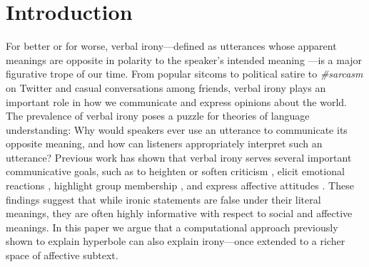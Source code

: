 \documentclass[10pt,letterpaper]{article}
\begin{document}
\section{Introduction}
For better or for worse, verbal irony---defined as utterances whose apparent meanings are opposite in polarity to the speaker's intended meaning \cite{roberts1994people, colston2000contrast}---is a major figurative trope of our time. From popular sitcoms to political satire to \emph{\#sarcasm} on Twitter and casual conversations among friends, verbal irony plays an important role in how we communicate and express  opinions about the world. The prevalence of verbal irony poses a puzzle for theories of language understanding: Why would speakers ever use an utterance to communicate its opposite meaning, and how can listeners appropriately interpret such an utterance? Previous work has shown that verbal irony serves several important communicative goals, such as to heighten or soften criticism \cite{colston1997salting}, elicit emotional reactions \cite{leggitt2000emotional}, highlight group membership \cite{gibbs2000irony}, and express affective attitudes \cite{colston1998you, colston1997ve}. These findings suggest that while ironic statements are false under their literal meanings, they are often highly informative with respect to social and affective meanings. 
In this paper we argue that a computational approach previously shown to explain hyperbole \cite{kao2014nonliteral} can also explain irony---once extended to a richer space of affective subtext. 

\end{document}
